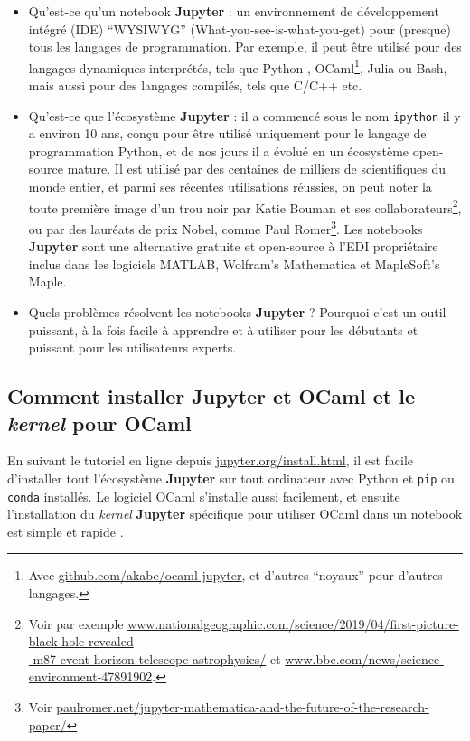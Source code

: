 \documentclass[runningheads]{llncs}
\newcommand{\Jupyter}{\textbf{Jupyter}}
\begin{document}
\begin{itemize}
    \item Qu'est-ce qu'un notebook \Jupyter{} : un environnement de développement intégré (IDE) ``WYSIWYG'' (What-you-see-is-what-you-get) pour (presque) tous les langages de programmation. Par exemple, il peut être utilisé pour des langages dynamiques interprétés, tels que Python \cite{python}, OCaml\footnote{Avec \url{github.com/akabe/ocaml-jupyter}, et d'autres ``noyaux'' pour d'autres langages.}, Julia ou Bash, mais aussi pour des langages compilés, tels que C/C++ etc.

    \item Qu'est-ce que l'écosystème \Jupyter{} : il a commencé sous le nom \texttt{ipython} \cite{ipython} il y a environ 10 ans, conçu pour être utilisé uniquement pour le langage de programmation Python, et de nos jours il a évolué en un écosystème open-source mature.
    Il est utilisé par des centaines de milliers de scientifiques du monde entier, et parmi ses récentes utilisations réussies, on peut noter la toute première image d'un trou noir par Katie Bouman et ses collaborateurs\footnote{Voir par exemple \url{www.nationalgeographic.com/science/2019/04/first-picture-black-hole-revealed}\\\url{-m87-event-horizon-telescope-astrophysics/} et \url{www.bbc.com/news/science-environment-47891902}.}, ou par des lauréats de prix Nobel, comme Paul Romer\footnote{Voir \url{paulromer.net/jupyter-mathematica-and-the-future-of-the-research-paper/}}.
    Les notebooks \Jupyter{} sont une alternative gratuite et open-source à l'EDI propriétaire inclus dans les logiciels MATLAB, Wolfram's Mathematica et MapleSoft's Maple.

    \item Quels problèmes résolvent les notebooks \Jupyter{} ? Pourquoi c'est un outil puissant, à la fois facile à apprendre et à utiliser pour les débutants et puissant pour les utilisateurs experts.
\end{itemize}


\subsection*{Comment installer \Jupyter{} et OCaml et le \emph{kernel} pour OCaml}

En suivant le tutoriel en ligne depuis \url{jupyter.org/install.html}, il est facile d'installer tout l'écosystème \Jupyter{} sur tout ordinateur avec Python et \texttt{pip} ou \texttt{conda} installés.
%
Le logiciel OCaml \cite{ocaml} s'installe aussi facilement, et ensuite l'installation du \emph{kernel} \Jupyter{} spécifique pour utiliser OCaml dans un notebook est simple et rapide \cite{akabe}.
\end{document}
